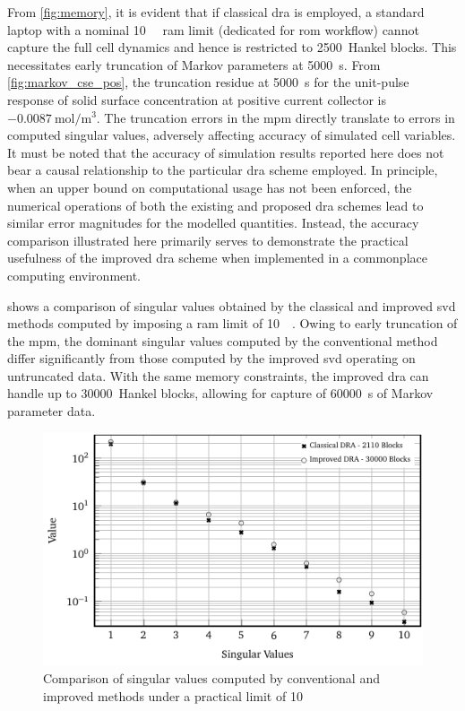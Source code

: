 From  \cref{fig:memory},   it  is  evident   that  if  classical   \gls{dra}  is
employed,  a  standard  laptop  with  a  nominal  \SI{10}{\giga\byte}  \gls{ram}
limit   (dedicated   for   \gls{rom}   workflow)   cannot   capture   the   full
cell   dynamics  and   hence   is  restricted   to   2500~Hankel  blocks.   This
necessitates early  truncation of Markov parameters  at \SI{5000}{\second}. From
\cref{fig:markov_cse_pos}, the truncation residue  at \SI{5000}{\second} for the
unit-pulse response of solid surface concentration at positive current collector
is~$\SI{-0.0087}{\mole\per\meter\cubed}$. The truncation errors in the \gls{mpm}
directly translate  to errors in  computed singular values,  adversely affecting
accuracy of  simulated cell  variables. It  must be noted  that the  accuracy of
simulation results  reported here  does not  bear a  causal relationship  to the
particular  \gls{dra} scheme  employed. In  principle,  when an  upper bound  on
computational usage has not been enforced,  the numerical operations of both the
existing and proposed \gls{dra} schemes lead to similar error magnitudes for the
modelled quantities. Instead, the accuracy comparison illustrated here primarily
serves to demonstrate the practical  usefulness of the improved \gls{dra} scheme
when implemented in a commonplace computing environment.

  shows a  comparison  of singular  values  obtained by  the
classical and improved \gls{svd} methods  computed by imposing a \gls{ram} limit
of \SI{10}{\giga\byte}. Owing to early truncation of the \gls{mpm}, the dominant
singular values  computed by the  conventional method differ  significantly from
those computed by the improved \gls{svd} operating on untruncated data. With the
same memory  constraints, the improved  \gls{dra} can handle up  to 30000~Hankel
blocks, allowing for capture of \SI{60000}{\second} of Markov parameter data.

\begin{figure}[!htbp]
    \centering
    \includegraphics{truncated.pdf}
    \caption{Comparison of singular values computed by conventional and improved
         methods under a practical  limit of
    \SI{10}{\giga\byte}}
    \label{fig:truncated}
\end{figure}

